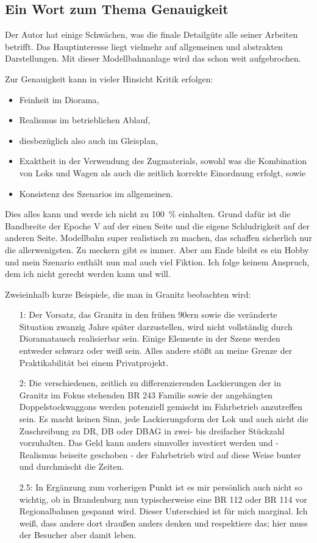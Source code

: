\subsection{Ein Wort zum Thema Genauigkeit}
\label{sec:modelingAccuracy}

Der Autor hat einige Schw\"achen, was die finale Detailg\"ute alle seiner Arbeiten betrifft.
Das Hauptinteresse liegt vielmehr auf allgemeinen und abstrakten Darstellungen.
Mit dieser Modellbahnanlage wird das schon weit aufgebrochen.

Zur Genauigkeit kann in vieler Hinsicht Kritik erfolgen:
\begin{itemize}
	\item Feinheit im Diorama,
	\item Realismus im betrieblichen Ablauf,
	\item diesbez\"uglich also auch im Gleisplan,
	\item Exaktheit in der Verwendung des Zugmaterials, sowohl was die Kombination von Loks und Wagen als auch die zeitlich korrekte Einordnung erfolgt, sowie
	\item Konsistenz des Szenarios im allgemeinen.
\end{itemize}

Dies alles kann und werde ich nicht zu 100~\% einhalten.
Grund daf\"ur ist die Bandbreite der Epoche V auf der einen Seite und die eigene Schludrigkeit auf der anderen Seite.
Modellbahn super realistisch zu machen, das schaffen sicherlich nur die allerwenigsten.
Zu meckern gibt es immer.
Aber am Ende bleibt es ein Hobby und mein Szenario enth\"alt nun mal auch viel Fiktion.
Ich folge keinem Anspruch, dem ich nicht gerecht werden kann und will.

Zweieinhalb kurze Beispiele, die man in Granitz beobachten wird:
\begin{itemize}
	\item[1:] Der Vorsatz, das Granitz in den fr\"uhen 90ern sowie die ver\"anderte Situation zwanzig Jahre sp\"ater darzustellen, wird nicht vollst\"andig durch Dioramatausch realisierbar sein.
	Einige Elemente in der Szene werden entweder schwarz oder wei{\ss} sein.
	Alles andere st\"o{\ss}t an meine Grenze der Praktikabilit\"at bei einem Privatprojekt.
	\item[2:] Die verschiedenen, zeitlich zu differenzierenden Lackierungen der in Granitz im Fokus stehenden BR 243 Familie sowie der angeh\"angten Doppelstockwaggons werden potenziell gemischt im Fahrbetrieb anzutreffen sein.
	Es macht keinen Sinn, jede Lackierungsform der Lok und auch nicht die Zuschreibung zu DR, DB oder DBAG in zwei- bis dreifacher St\"uckzahl vorzuhalten.
	Das Geld kann anders sinnvoller investiert werden und - Realismus beiseite geschoben - der Fahrbetrieb wird auf diese Weise bunter und durchmischt die Zeiten.
	\item[2.5:] In Erg\"anzung zum vorherigen Punkt ist es mir pers\"onlich auch nicht so wichtig, ob in Brandenburg nun typischerweise eine BR 112 oder BR 114 vor Regionalbahnen gespannt wird.
	Dieser Unterschied ist f\"ur mich marginal.
	Ich wei{\ss}, dass andere dort drau{\ss}en anders denken und respektiere das; hier muss der Besucher aber damit leben.
\end{itemize}

